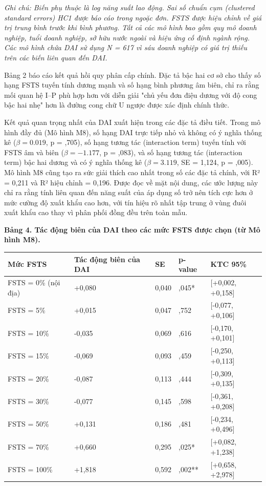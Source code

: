 \documentclass[12pt,a4paper]{article}
\begin{document}
\emph{Ghi chú: Biến phụ thuộc là log năng suất lao động. Sai số chuẩn
cụm (clustered standard errors) HC1 được báo cáo trong ngoặc đơn. FSTS
được hiệu chỉnh về giá trị trung bình trước khi bình phương. Tất cả các
mô hình bao gồm quy mô doanh nghiệp, tuổi doanh nghiệp, sở hữu nước
ngoài và hiệu ứng cố định ngành rộng. Các mô hình chứa DAI sử dụng N =
617 vì sáu doanh nghiệp có giá trị thiếu trên các biến liên quan đến
DAI.}

Bảng 2 báo cáo kết quả hồi quy phân cấp chính. Đặc tả bậc hai cơ sở cho
thấy số hạng FSTS tuyến tính dương mạnh và số hạng bình phương âm biên,
chỉ ra rằng mối quan hệ I--P phù hợp hơn với diễn giải "chủ yếu đơn điệu
dương với độ cong bậc hai nhẹ" hơn là đường cong chữ U ngược được xác
định chính thức.

Kết quả quan trọng nhất của DAI xuất hiện trong các đặc tả điều tiết.
Trong mô hình đầy đủ (Mô hình M8), số hạng DAI trực tiếp nhỏ và không có
ý nghĩa thống kê (\(\beta = 0.019\), p = ,705), số hạng tương tác
(interaction term) tuyến tính với FSTS âm và biên (\(\beta = −1.177\), p
= ,083), và số hạng tương tác (interaction term) bậc hai dương và có ý
nghĩa thống kê (\(\beta = 3.119\), SE = 1,124, p = ,005). Mô hình M8
cũng tạo ra sức giải thích cao nhất trong số các đặc tả chính, với R² =
0,211 và R² hiệu chỉnh = 0,196. Được đọc về mặt nội dung, các ước lượng
này chỉ ra rằng tính liên quan đến năng suất của áp dụng số trở nên tích
cực hơn ở mức cường độ xuất khẩu cao hơn, với tín hiệu rõ nhất tập trung
ở vùng đuôi xuất khẩu cao thay vì phân phối đồng đều trên toàn mẫu.

\textbf{Bảng 4. Tác động biên của DAI theo các mức FSTS được chọn (từ Mô
hình M8).}

\begin{longtable}[]{@{}lllll@{}}
\toprule\noalign{}
Mức FSTS & Tác động biên của DAI & SE & p-value & KTC 95\% \\
\midrule\noalign{}
\endhead
\bottomrule\noalign{}
\endlastfoot
FSTS = 0\% (nội địa) & +0,080 & 0,040 & ,045* & {[}+0,002, +0,158{]} \\
FSTS = 5\% & +0,015 & 0,047 & ,752 & {[}-0,077, +0,106{]} \\
FSTS = 10\% & -0,035 & 0,069 & ,616 & {[}-0,170, +0,101{]} \\
FSTS = 15\% & -0,069 & 0,093 & ,459 & {[}-0,250, +0,113{]} \\
FSTS = 20\% & -0,087 & 0,113 & ,444 & {[}-0,309, +0,135{]} \\
FSTS = 30\% & -0,077 & 0,145 & ,598 & {[}-0,361, +0,208{]} \\
FSTS = 50\% & +0,131 & 0,186 & ,481 & {[}-0,234, +0,496{]} \\
FSTS = 70\% & +0,660 & 0,295 & ,025* & {[}+0,082, +1,238{]} \\
FSTS = 100\% & +1,818 & 0,592 & ,002** & {[}+0,658, +2,978{]} \\
\end{longtable}
\end{document}
